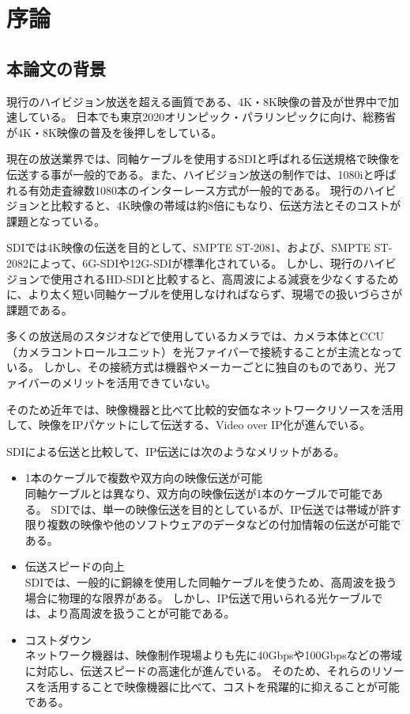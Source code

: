 \chapter{序論}
\label{chap:introduction}

\section{本論文の背景}
現行のハイビジョン放送を超える画質である、4K・8K映像の普及が世界中で加速している。
日本でも東京2020オリンピック・パラリンピックに向け、総務省が4K・8K映像の普及を後押しをしている。

現在の放送業界では、同軸ケーブルを使用するSDIと呼ばれる伝送規格で映像を伝送する事が一般的である。また、ハイビジョン放送の制作では、1080iと呼ばれる有効走査線数1080本のインターレース方式が一般的である。
現行のハイビジョンと比較すると、4K映像の帯域は約8倍にもなり、伝送方法とそのコストが課題となっている。

SDIでは4K映像の伝送を目的として、SMPTE ST-2081\cite{smpte-st-2081}、および、SMPTE ST-2082\cite{smpte-st-2082}によって、6G-SDIや12G-SDIが標準化されている。
しかし、現行のハイビジョンで使用されるHD-SDIと比較すると、高周波による減衰を少なくするために、より太く短い同軸ケーブルを使用しなければならず、現場での扱いづらさが課題である。

多くの放送局のスタジオなどで使用しているカメラでは、カメラ本体とCCU（カメラコントロールユニット）を光ファイバーで接続することが主流となっている。
しかし、その接続方式は機器やメーカーごとに独自のものであり、光ファイバーのメリットを活用できていない。

そのため近年では、映像機器と比べて比較的安価なネットワークリソースを活用して、映像をIPパケットにして伝送する、Video over IP化が進んでいる。

SDIによる伝送と比較して、IP伝送には次のようなメリットがある\cite{kodera-interbee2015}。
\begin{itemize}
  \item 1本のケーブルで複数や双方向の映像伝送が可能\mbox{}\\
    同軸ケーブルとは異なり、双方向の映像伝送が1本のケーブルで可能である。
    SDIでは、単一の映像伝送を目的としているが、IP伝送では帯域が許す限り複数の映像や他のソフトウェアのデータなどの付加情報の伝送が可能である。
  \item 伝送スピードの向上\mbox{}\\
    SDIでは、一般的に銅線を使用した同軸ケーブルを使うため、高周波を扱う場合に物理的な限界がある。
    しかし、IP伝送で用いられる光ケーブルでは、より高周波を扱うことが可能である。
  \item コストダウン\mbox{}\\
    ネットワーク機器は、映像制作現場よりも先に40Gbpsや100Gbpsなどの帯域に対応し、伝送スピードの高速化が進んでいる。
    そのため、それらのリソースを活用することで映像機器に比べて、コストを飛躍的に抑えることが可能である。
\end{itemize}

